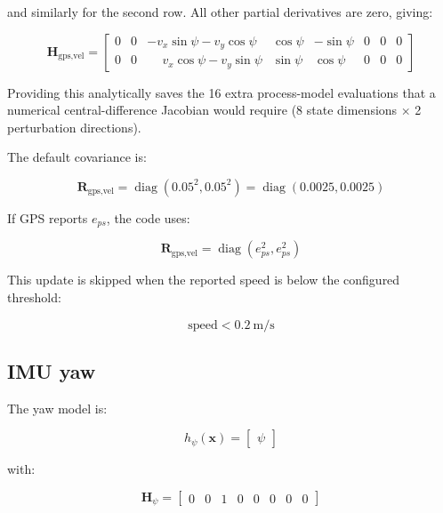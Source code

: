 \documentclass[11pt]{article}
\newcommand{\vect}[1]{\boldsymbol{#1}}
\newcommand{\mat}[1]{\mathbf{#1}}
\newcommand{\diag}{\operatorname{diag}}
\begin{document}
and similarly for the second row.  All other partial derivatives are zero, giving:

\begin{equation}
\mat{H}_{\text{gps,vel}} =
\begin{bmatrix}
0 & 0 & -v_x\sin\psi - v_y\cos\psi & \cos\psi & -\sin\psi & 0 & 0 & 0 \\
0 & 0 & \phantom{-}v_x\cos\psi - v_y\sin\psi & \sin\psi & \cos\psi & 0 & 0 & 0
\end{bmatrix}
\end{equation}

Providing this analytically saves the 16 extra process-model evaluations that a
numerical central-difference Jacobian would require (8 state dimensions
$\times$ 2 perturbation directions).

The default covariance is:

\begin{equation}
\mat{R}_{\text{gps,vel}} = \diag(0.05^2, 0.05^2) = \diag(0.0025, 0.0025)
\end{equation}

If GPS reports $e_{ps}$, the code uses:

\begin{equation}
\mat{R}_{\text{gps,vel}} = \diag(e_{ps}^2, e_{ps}^2)
\end{equation}

This update is skipped when the reported speed is below the configured threshold:

\begin{equation}
\text{speed} < 0.2~\text{m/s}
\end{equation}

\subsection{IMU yaw}

The yaw model is:

\begin{equation}
h_{\psi}(\vect{x}) =
\begin{bmatrix}
\psi
\end{bmatrix}
\end{equation}

with:

\begin{equation}
\mat{H}_{\psi} =
\begin{bmatrix}
0 & 0 & 1 & 0 & 0 & 0 & 0 & 0
\end{bmatrix}
\end{equation}
\end{document}
